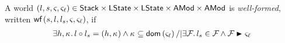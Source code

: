 


\begin{definition}
A world $(l, s, \varsigma_{}, \varsigma_{\ell}) \in
\mathsf{Stack}\times\textsf{LState}\times\textsf{LState}\times\textsf{AMod}\times\textsf{AMod}$ is
\emph{well-formed}, written $\textsf{wf}\left( s, l, l_s, \varsigma_{}, \varsigma_{\ell} \right)$, if
\begin{align*}
  \exsts{h,\ca{}}
  l \composeL l_s = (h,\ca{}) \land \ca{}\subseteq \dom{\amod{\ell}}
  /|
  \exsts{\fence{}} 
  l_s \in \fence{} \land 
  \fence{} \strictfences \amod{\ell}
\end{align*}
\end{definition}










